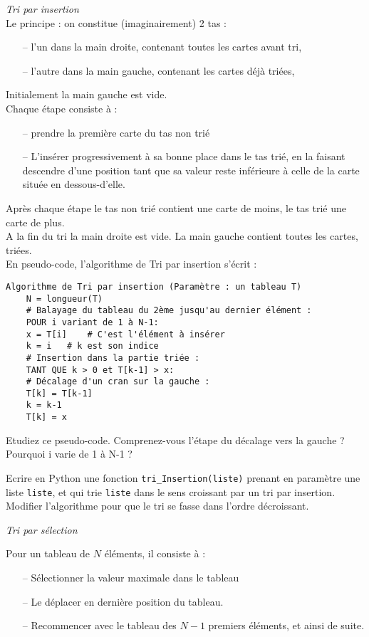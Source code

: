 \textit{Tri par insertion} \\
Le principe : on constitue (imaginairement) 2 tas : \\
\begin{enumerate}
	\item[--] l'un dans la main droite, contenant toutes les cartes avant tri,
	\item[--] l'autre dans la main gauche, contenant les cartes déjà triées,
\end{enumerate}
Initialement la main gauche est vide. \\

Chaque étape consiste à : \\
\begin{enumerate}
	\item[--] prendre la première carte du tas non trié
	\item[--] L'insérer progressivement à sa bonne place dans le tas trié, en la faisant descendre d'une position tant que sa valeur reste inférieure à celle de la carte située en dessous-d'elle.
\end{enumerate}
Après chaque étape le tas non trié contient une carte de moins, le tas trié une carte de plus.\\
A la fin du tri la main droite est vide. La main gauche contient toutes les cartes, triées. \\

\newpage
En pseudo-code, l'algorithme de Tri par insertion s'écrit :
\begin{Verbatim}[tabsize=4]
	Algorithme de Tri par insertion (Paramètre : un tableau T)
	N = longueur(T)
	# Balayage du tableau du 2ème jusqu'au dernier élément :
	POUR i variant de 1 à N-1:
	x = T[i] 	# C'est l'élément à insérer
	k = i 	# k est son indice
	# Insertion dans la partie triée :
	TANT QUE k > 0 et T[k-1] > x:
	# Décalage d'un cran sur la gauche :
	T[k] = T[k-1]
	k = k-1
	T[k] = x
\end{Verbatim}

\ques Etudiez ce pseudo-code. Comprenez-vous l'étape du décalage vers la gauche ? Pourquoi i varie de 1 à N-1 ?

\ques Ecrire en Python une fonction \texttt{tri\_Insertion(liste)} prenant en paramètre une liste \texttt{liste}, et qui trie \texttt{liste} dans le sens croissant par un tri par insertion.
 Modifier l'algorithme pour que le tri se fasse dans l'ordre décroissant.

\textit{Tri par sélection}

Pour un tableau de $N$ éléments, il consiste à :
\begin{enumerate}
	\item[--] Sélectionner la valeur maximale dans le tableau
	\item[--] Le déplacer en dernière position du tableau.
	\item[--] Recommencer avec le tableau des $N-1$ premiers éléments, et ainsi de suite.
\end{enumerate}


